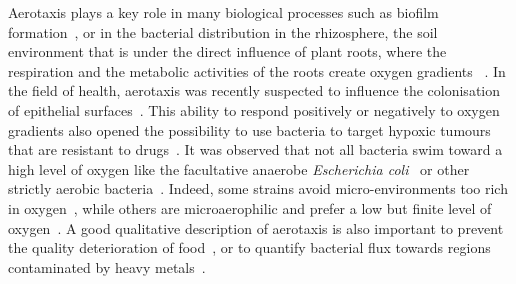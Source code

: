 \documentclass[aps,a4paper,twocolumn,10pt,pre,showpacs]{revtex4-2}
\begin{document}
Aerotaxis plays a key role in many biological processes such as biofilm formation~\cite{Armitano2013,Ardre2015,Holscher2015,Wu2019}, or in the bacterial distribution in the rhizosphere, the soil environment that is under the direct influence of plant roots, where the respiration and the metabolic activities of the roots %
create oxygen gradients%
~\cite{alexandre_2004}. In the field of health, aerotaxis was recently suspected to influence the colonisation of epithelial surfaces~\cite{Tamar2016}. This ability to respond positively or negatively to oxygen gradients also opened the possibility to use bacteria to target hypoxic tumours that are resistant to drugs~\cite{felfoul_magneto-aerotactic_2016,baban_bacteria_2010}. It was observed that not all bacteria swim toward a high level of oxygen like the facultative anaerobe \emph{Escherichia coli}~\cite{Adler2012} or other strictly aerobic bacteria~\cite{morse2016,menolascina2017logarithmic}. Indeed, some strains avoid micro-environments too rich in oxygen~\cite{Taylor1983}, while others are microaerophilic and prefer a low but finite level of oxygen~\cite{Frankel1997,popp2014polarity,mazzag2003model,Fischer2006,Stricker2020}. A good qualitative description of aerotaxis is also important to prevent the quality deterioration of food~\cite{Shirai2017}, or to quantify bacterial flux towards regions contaminated by heavy metals~\cite{Stricker2020,Wu2019,Armitano2013}. 


\end{document}
